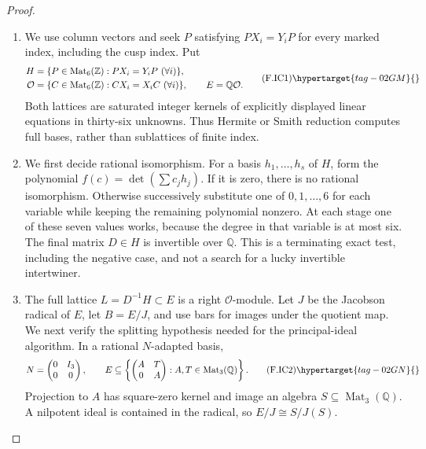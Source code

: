 \begin{proof}
\begin{enumerate}[label={$\langle1\rangle$\arabic*.}]
\item We use column vectors and seek $P$ satisfying $PX_i=Y_iP$ for every
marked index, including the cusp index. Put
\[
\begin{aligned}
 H&=\{P\in\operatorname{Mat}_6(\mathbb Z):PX_i=Y_iP\ (\forall i)\},\\
 \mathcal O&=\{C\in\operatorname{Mat}_6(\mathbb Z):CX_i=X_iC\ (\forall i)\},
 \qquad E=\mathbb Q\mathcal O.
\end{aligned}                                                    \tag{F.IC1}\hypertarget{tag-02GM}{}\label{maps:eq:F.IC1}
\]
Both lattices are saturated integer kernels of explicitly displayed
linear equations in thirty-six unknowns. Thus Hermite or Smith
reduction computes full bases, rather than sublattices of finite index.

\item We first decide rational isomorphism. For a basis $h_1,\ldots,h_s$ of
$H$, form the polynomial $f(c)=\det(\sum c_jh_j)$. If it is zero,
there is no rational isomorphism. Otherwise successively substitute
one of $0,1,\ldots,6$ for each variable while keeping the remaining
polynomial nonzero. At each stage one of these seven values works,
because the degree in that variable is at most six. The final matrix
$D\in H$ is invertible over $\mathbb Q$. This is a terminating exact
test, including the negative case, and not a search for a lucky
invertible intertwiner.

\item The full lattice $L=D^{-1}H\subset E$ is a right $\mathcal O$-module.
Let $J$ be the Jacobson radical of $E$, let $B=E/J$, and use bars
for images under the quotient map. We next verify the splitting
hypothesis needed for the principal-ideal algorithm. In a rational
$N$-adapted basis,
\[
 N=\begin{pmatrix}0&I_3\\0&0\end{pmatrix},\qquad
 E\subseteq
 \left\{\begin{pmatrix}A&T\\0&A\end{pmatrix}:A,T\in
                                      \operatorname{Mat}_3(\mathbb Q)\right\}.
                                                               \tag{F.IC2}\hypertarget{tag-02GN}{}\label{maps:eq:F.IC2}
\]
Projection to $A$ has square-zero kernel and image an algebra
$S\subseteq\operatorname{Mat}_3(\mathbb Q)$. A nilpotent ideal is
contained in the radical, so $E/J\cong S/J(S)$.


\end{enumerate}
\end{proof}
